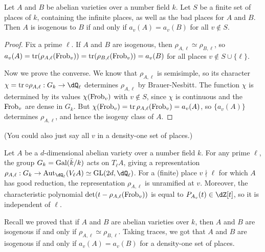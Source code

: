 \begin{theorem}
Let $A$ and $B$ be abelian varieties over a number field $k$. Let $S$ be a
finite set of places of $k$, containing the infinite places, as well as the 
bad places for $A$ and $B$. Then $A$ is isogenous to $B$ if and only if 
$a_v(A)=a_v(B)$ for all $v\notin S$. 
\end{theorem}
\begin{proof}
Fix a prime $\ell$. If $A$ and $B$ are isogenous, then 
$\rho_{A,\ell}\simeq \rho_{B,\ell}$, so 
$a_v(A)=\operatorname{tr}(\rho_{A,\ell}(\mathrm{Frob}_v))=\operatorname{tr}(\rho_{B,\ell}(\mathrm{Frob}_v))=a_v(B)$ 
for all places $v\notin S\cup\{\ell\}$. 

Now we prove the converse. We know that $\rho_{A,\ell}$ is semisimple, so its 
character $\chi=\trace\circ \rho_{A,\ell}:G_k \to \dQ_\ell$ determines 
$\rho_{A,\ell}$ by Brauer-Nesbitt. The function $\chi$ is determined by its 
values $\chi(\mathrm{Frob}_v)$ with $v\notin S$, since $\chi$ is continuous and the 
$\mathrm{Frob}_v$ are dense in $G_k$. But 
$\chi(\mathrm{Frob}_v)=\operatorname{tr} \rho_{A,\ell}(\mathrm{Frob}_v) = a_v(A)$, so $\{a_v(A)\}$ 
determines $\rho_{A,\ell}$, and hence the isogeny class of $A$. 
\end{proof}

(You could also just say all $v$ in a density-one set of places.) 






Let $A$ be a $d$-dimensional abelian variety over a number field $k$. For any 
prime $\ell$, the group $G_k=\operatorname{Gal}(\bar k/k)$ acts on $T_\ell A$, giving a 
representation 
$\rho_{A,\ell}:G_k \to \aut_{\dQ_\ell}(V_\ell A) \simeq \operatorname{GL}(2 d,\dQ_\ell)$. 
For a (finite) place $v\nmid \ell$ for which $A$ has good reduction, the 
representation $\rho_{A,\ell}$ is unramified at $v$. Moreover, the 
characteristic polynomial $\det(t-\rho_{A,\ell}(\mathrm{Frob}_v))$ is equal to 
$P_{A_v}(t)\in \dZ[t]$, so it is independent of $\ell$. 

Recall we proved that if $A$ and $B$ are abelian varieties over $k$, then 
$A$ and $B$ are isogenous if and only if $\rho_{A,\ell}\simeq \rho_{B,\ell}$. 
Taking traces, we got that $A$ and $B$ are isogenous if and only if 
$a_v(A)=a_v(B)$ for a density-one set of places. 


